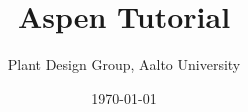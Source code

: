 \documentclass[a4paper,12pt]{book}
\begin{document}
\author{Plant Design Group, Aalto University}
\title{Aspen Tutorial}
\date{\today}

\frontmatter
\maketitle
\tableofcontents

\mainmatter



\backmatter
\end{document}
